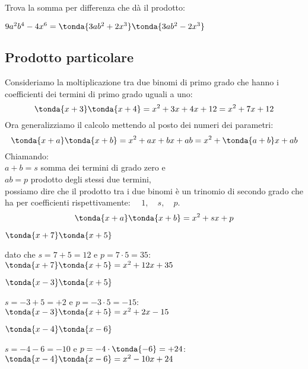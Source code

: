 \begin{esempio}
Trova la somma per differenza che dà il prodotto:

\(9a^2b^4-4x^6 = \tonda{3ab^{2}+2x^3} \tonda{3ab^{2}-2x^3}\)
\end{esempio}



\subsection{Prodotto particolare}
\label{subsec:11_prodnot_particolare}

Consideriamo la moltiplicazione tra due binomi di primo grado che hanno i 
coefficienti dei termini di primo grado uguali a uno:
\[\tonda{x +3} \tonda{x+4} = x^2 +3x +4x +12 = x^2 +7x +12\]
Ora generalizziamo il calcolo mettendo al posto dei numeri dei parametri:
\[\tonda{x +a} \tonda{x+b} = x^2 +ax +bx +ab = x^2 +\tonda{a+b}x +ab\]
Chiamando:\\
\(a+b=s\) \quad somma dei termini di grado zero e\\
\(ab=p\) \quad prodotto degli stessi due termini,\\
possiamo dire che il prodotto tra i due binomi è un trinomio di secondo 
grado che ha per coefficienti rispettivamente: \(\quad 1, \quad s,\quad p\).
\[\tonda{x +a} \tonda{x+b} = x^2 +sx +p\]

\begin{esempio}
\(\tonda{x+7} \tonda{x+5}\)

dato che \quad \(s=7+5=12\) \quad e \quad \(p=7 \cdot 5=35\): \qquad
\(\tonda{x+7} \tonda{x+5}=x^2+12x+35\)
\end{esempio}

\begin{esempio}
\(\tonda{x-3} \tonda{x+5}\)

\(s=-3+5=+2\) \quad e \quad \(p=-3 \cdot 5=-15\):\qquad 
\(\tonda{x-3} \tonda{x+5}=x^2+2x-15\)
\end{esempio}

\begin{esempio}
\(\tonda{x-4} \tonda{x-6}\)

\(s=-4-6=-10\) \quad e \quad \(p=-4 \cdot \tonda{-6}=+24\):
\quad \(\tonda{x-4} \tonda{x-6}=x^2-10x+24\)
\end{esempio}

